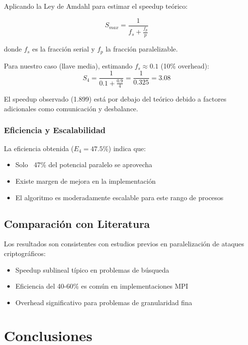 \documentclass[12pt,letterpaper]{article}
\begin{document}
Aplicando la Ley de Amdahl para estimar el speedup teórico:

\begin{equation}
S_{max} = \frac{1}{f_s + \frac{f_p}{p}}
\end{equation}

donde $f_s$ es la fracción serial y $f_p$ la fracción paralelizable.

Para nuestro caso (llave media), estimando $f_s \approx 0.1$ (10\% overhead):
\begin{equation}
S_{4} = \frac{1}{0.1 + \frac{0.9}{4}} = \frac{1}{0.325} = 3.08
\end{equation}

El speedup observado (1.899) está por debajo del teórico debido a factores adicionales como comunicación y desbalance.

\subsubsection{Eficiencia y Escalabilidad}

La eficiencia obtenida ($E_4 = 47.5\%$) indica que:
\begin{itemize}
    \item Solo ~47\% del potencial paralelo se aprovecha
    \item Existe margen de mejora en la implementación
    \item El algoritmo es moderadamente escalable para este rango de procesos
\end{itemize}

\subsection{Comparación con Literatura}

Los resultados son consistentes con estudios previos en paralelización de ataques criptográficos:
\begin{itemize}
    \item Speedup sublineal típico en problemas de búsqueda
    \item Eficiencia del 40-60\% es común en implementaciones MPI
    \item Overhead significativo para problemas de granularidad fina
\end{itemize}

\section{Conclusiones}
\end{document}
